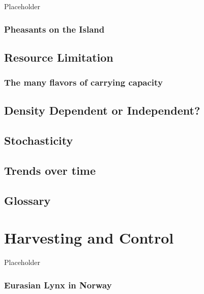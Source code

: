 \documentclass[]{book}
\theoremstyle{definition}
\theoremstyle{definition}
\theoremstyle{definition}
\theoremstyle{remark}
\begin{document}
Placeholder

\hypertarget{pheasants-on-the-island}{%
\subsection*{Pheasants on the Island}\label{pheasants-on-the-island}}

\hypertarget{resource-limitation}{%
\section{Resource Limitation}\label{resource-limitation}}

\hypertarget{the-many-flavors-of-carrying-capacity}{%
\subsection{The many flavors of carrying
capacity}\label{the-many-flavors-of-carrying-capacity}}

\hypertarget{density-dependent-or-independent}{%
\section{Density Dependent or
Independent?}\label{density-dependent-or-independent}}

\hypertarget{stochasticity}{%
\section{Stochasticity}\label{stochasticity}}

\hypertarget{trends-over-time}{%
\section{Trends over time}\label{trends-over-time}}

\hypertarget{glossary-2}{%
\section{Glossary}\label{glossary-2}}

\hypertarget{chap:harvesting}{%
\chapter{Harvesting and Control}\label{chap:harvesting}}

Placeholder

\hypertarget{eurasian-lynx-in-norway}{%
\subsection*{Eurasian Lynx in Norway}\label{eurasian-lynx-in-norway}}
\end{document}
